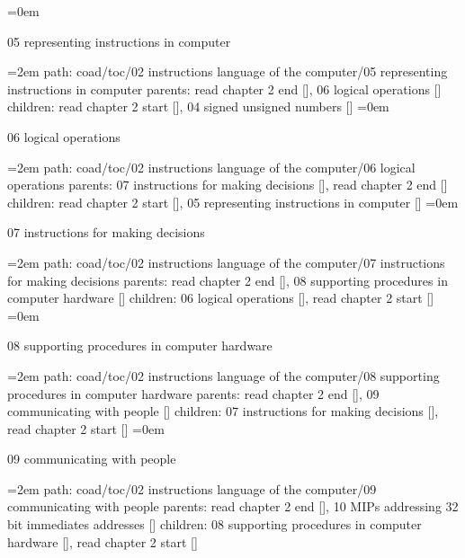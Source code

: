 \smallskip
\leftskip=0em
\par\endgroup
\bigskip
{}
05 representing instructions in computer
\smallskip
\par\begingroup
\leftskip=2em
path: coad/toc/02 instructions language of the computer/05 representing instructions in computer
\smallskip
parents:  read chapter 2 end [], 06 logical operations []
\smallskip
children: read chapter 2 start [], 04 signed unsigned numbers []
\smallskip
\leftskip=0em
\par\endgroup
\bigskip
{}
06 logical operations
\smallskip
\par\begingroup
\leftskip=2em
path: coad/toc/02 instructions language of the computer/06 logical operations
\smallskip
parents:  07 instructions for making decisions [], read chapter 2 end []
\smallskip
children: read chapter 2 start [], 05 representing instructions in computer []
\smallskip
\leftskip=0em
\par\endgroup
\bigskip
{}
07 instructions for making decisions
\smallskip
\par\begingroup
\leftskip=2em
path: coad/toc/02 instructions language of the computer/07 instructions for making decisions
\smallskip
parents:  read chapter 2 end [], 08 supporting procedures in computer hardware []
\smallskip
children: 06 logical operations [], read chapter 2 start []
\smallskip
\leftskip=0em
\par\endgroup
\bigskip
{}
08 supporting procedures in computer hardware
\smallskip
\par\begingroup
\leftskip=2em
path: coad/toc/02 instructions language of the computer/08 supporting procedures in computer hardware
\smallskip
parents:  read chapter 2 end [], 09 communicating with people []
\smallskip
children: 07 instructions for making decisions [], read chapter 2 start []
\smallskip
\leftskip=0em
\par\endgroup
\bigskip
{}
09 communicating with people
\smallskip
\par\begingroup
\leftskip=2em
path: coad/toc/02 instructions language of the computer/09 communicating with people
\smallskip
parents:  read chapter 2 end [], 10 MIPs addressing 32 bit immediates addresses []
\smallskip
children: 08 supporting procedures in computer hardware [], read chapter 2 start []
\smallskip

